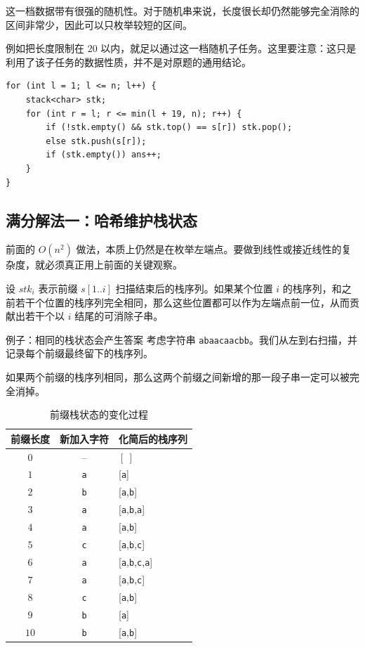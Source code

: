 \documentclass{book}
\begin{document}
    这一档数据带有很强的随机性。对于随机串来说，长度很长却仍然能够完全消除的区间非常少，因此可以只枚举较短的区间。

    例如把长度限制在 $20$ 以内，就足以通过这一档随机子任务。这里要注意：这只是利用了该子任务的数据性质，并不是对原题的通用结论。

    \begin{lstlisting}[style = code]
for (int l = 1; l <= n; l++) {
    stack<char> stk;
    for (int r = l; r <= min(l + 19, n); r++) {
        if (!stk.empty() && stk.top() == s[r]) stk.pop();
        else stk.push(s[r]);
        if (stk.empty()) ans++;
    }
}
    \end{lstlisting}

\newpage
    \subsection{满分解法一：哈希维护栈状态}

    前面的 $O(n^2)$ 做法，本质上仍然是在枚举左端点。要做到线性或接近线性的复杂度，就必须真正用上前面的关键观察。

    设 $stk_i$ 表示前缀 $s[1..i]$ 扫描结束后的栈序列。如果某个位置 $i$ 的栈序列，和之前若干个位置的栈序列完全相同，那么这些位置都可以作为左端点前一位，从而贡献出若干个以 $i$ 结尾的可消除子串。

    \begin{examplebox}{例子：相同的栈状态会产生答案}
        考虑字符串 \texttt{abaacaacbb}。我们从左到右扫描，并记录每个前缀最终留下的栈序列。

        如果两个前缀的栈序列相同，那么这两个前缀之间新增的那一段子串一定可以被完全消掉。
    \end{examplebox}

    \begin{table}[h]
    \centering
    \begin{tabular}{|c|c|l|}
    \hline
    \textbf{前缀长度} & \textbf{新加入字符} & \textbf{化简后的栈序列} \\ \hline
    $0$ & -- & $[\ ]$ \\ \hline
    $1$ & \texttt{a} & [\texttt{a}] \\ \hline
    $2$ & \texttt{b} & [\texttt{a},\texttt{b}] \\ \hline
    $3$ & \texttt{a} & [\texttt{a},\texttt{b},\texttt{a}] \\ \hline
    $4$ & \texttt{a} & [\texttt{a},\texttt{b}] \\ \hline
    $5$ & \texttt{c} & [\texttt{a},\texttt{b},\texttt{c}] \\ \hline
    $6$ & \texttt{a} & [\texttt{a},\texttt{b},\texttt{c},\texttt{a}] \\ \hline
    $7$ & \texttt{a} & [\texttt{a},\texttt{b},\texttt{c}] \\ \hline
    $8$ & \texttt{c} & [\texttt{a},\texttt{b}] \\ \hline
    $9$ & \texttt{b} & [\texttt{a}] \\ \hline
    $10$ & \texttt{b} & [\texttt{a},\texttt{b}] \\ \hline
    \end{tabular}
    \caption{前缀栈状态的变化过程}
    \end{table}
\end{document}
